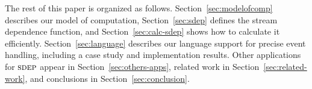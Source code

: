The rest of this paper is organized as follows.  Section~\ref{sec:modelofcomp} describes
our model of computation, Section~\ref{sec:sdep} 
defines the stream dependence function, and Section~\ref{sec:calc-sdep}
shows how to calculate it
efficiently.  Section~\ref{sec:language} describes our language support for precise
event handling, including a case study and implementation results.
Other applications for $\textsc{sdep}$ appear in
Section~\ref{sec:others-apps}, related work in
Section~\ref{sec:related-work}, and conclusions in
Section~\ref{sec:conclusion}.



				   
